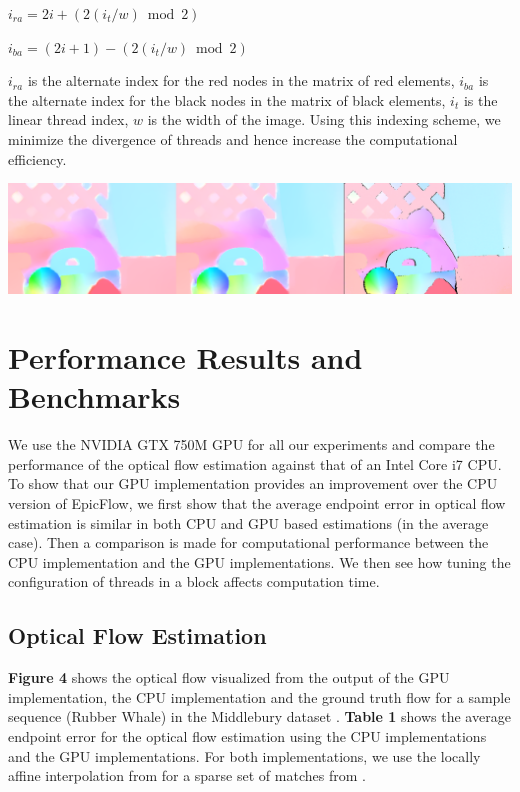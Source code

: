 \documentclass[english]{article}
\begin{document}
	\begin{center}	
	$i_{ra} = 2i + (2(i_t/w) \bmod 2)$
	\end{center}

	\begin{center}	
	$i_{ba} = (2i+1) - (2(i_t/w) \bmod 2)$
	\end{center}

	 $i_{ra}$ is the alternate index for the red nodes in the matrix of red elements, $i_{ba}$ is the alternate index for the black nodes in the matrix of black elements, $i_t$ is the linear thread index, $w$ is the width of the image. Using this indexing scheme, we minimize the divergence of threads and hence increase the computational efficiency.

	\begin{center}
	\includegraphics[width=170mm]{results/images/3_cpu_gpu_gt.png}
	\end{center}

	\section{Performance Results and Benchmarks}
	We use the NVIDIA GTX 750M GPU for all our experiments and compare the performance of the optical flow estimation against that of an Intel Core i7 CPU. To show that our GPU implementation provides an improvement over the CPU version of EpicFlow, we first show that the average endpoint error in optical flow estimation is similar in both CPU and GPU based estimations (in the average case). Then a comparison is made for computational performance between the CPU implementation and the GPU implementations. We then see how tuning the configuration of threads in a block affects computation time.

	\subsection{Optical Flow Estimation}
	\textbf{Figure 4} shows the optical flow visualized from the output of the GPU implementation, the CPU implementation and the ground truth flow for a sample sequence (Rubber Whale) in the Middlebury dataset \cite{12}. \textbf{Table 1} shows the average endpoint error for the optical flow estimation using the CPU implementations and the GPU implementations. For both implementations, we use the locally affine interpolation from \cite{1} for a sparse set of matches from \cite{3}. 
\end{document}
